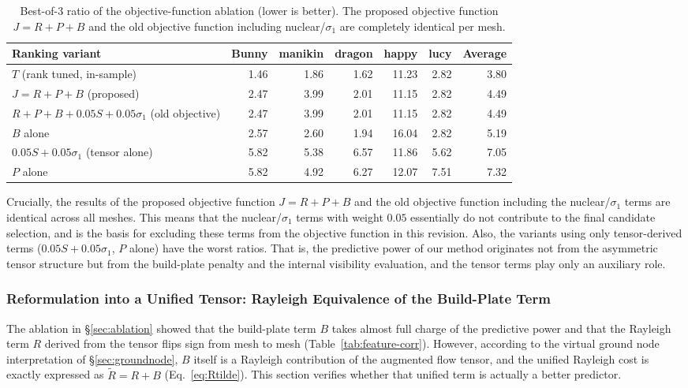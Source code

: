 \documentclass[11pt,a4paper]{article}
\begin{document}
\begin{table}[H]
\centering
\caption{Best-of-3 ratio of the objective-function ablation (lower is better).
The proposed objective function $J=R+P+B$ and the old objective function including nuclear/$\sigma_1$ are completely identical per mesh.}
\label{tab:ablation}
\begin{tabular}{lrrrrrr}
\toprule
Ranking variant & Bunny & manikin & dragon & happy & lucy & Average\\
\midrule
$T$ (rank tuned, in-sample) & 1.46 & 1.86 & 1.62 & 11.23 & 2.82 & 3.80\\
$J=R+P+B$ (proposed)            & 2.47 & 3.99 & 2.01 & 11.15 & 2.82 & 4.49\\
$R{+}P{+}B{+}0.05S{+}0.05\sigma_1$ (old objective) & 2.47 & 3.99 & 2.01 & 11.15 & 2.82 & 4.49\\
$B$ alone                     & 2.57 & 2.60 & 1.94 & 16.04 & 2.82 & 5.19\\
$0.05S+0.05\sigma_1$ (tensor alone) & 5.82 & 5.38 & 6.57 & 11.86 & 5.62 & 7.05\\
$P$ alone                     & 5.82 & 4.92 & 6.27 & 12.07 & 7.51 & 7.32\\
\bottomrule
\end{tabular}
\end{table}

Crucially, the results of the proposed objective function $J=R+P+B$ and the old objective function including the nuclear/$\sigma_1$ terms are identical across all meshes.
This means that the nuclear/$\sigma_1$ terms with weight $0.05$ essentially do not contribute to the final candidate selection,
and is the basis for excluding these terms from the objective function in this revision.
Also, the variants using only tensor-derived terms ($0.05S+0.05\sigma_1$, $P$ alone) have the worst ratios.
That is, the predictive power of our method originates not from the asymmetric tensor structure but from the build-plate penalty and the internal visibility evaluation,
and the tensor terms play only an auxiliary role.

\subsubsection{Reformulation into a Unified Tensor: Rayleigh Equivalence of the Build-Plate Term}
\label{sec:unified}

The ablation in \S\ref{sec:ablation} showed that the build-plate term $B$ takes almost full charge of the predictive power
and that the Rayleigh term $R$ derived from the tensor flips sign from mesh to mesh (Table~\ref{tab:feature-corr}).
However, according to the virtual ground node interpretation of \S\ref{sec:groundnode}, $B$ itself is a Rayleigh contribution of the augmented flow tensor,
and the unified Rayleigh cost is exactly expressed as $\tilde R=R+B$ (Eq.~\eqref{eq:Rtilde}).
This section verifies whether that unified term is actually a better predictor.
\end{document}
